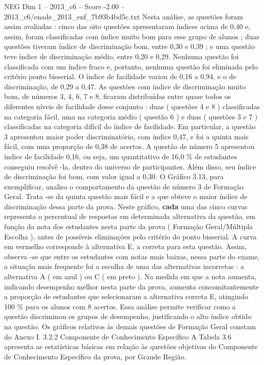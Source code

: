 \begin{textsample}{NEG Dim 1 – 2013\_c6 – Score -2.00 – 2013\_c6/enade\_2013\_enf\_7b93b4bd5c.txt}
Nesta análise, as questões foram assim avaliadas : cinco das oito questões apresentaram índices acima de 0,40 e, assim, foram classificadas com índice muito bom para esse grupo de alunos ; duas questões tiveram índice de discriminação bom, entre 0,30 e 0,39 ; e uma questão teve índice de discriminação médio, entre 0,20 e 0,29.
Nenhuma questão foi classificada com um índice fraco e, portanto, nenhuma questão foi eliminada pelo critério ponto bisserial.
O índice de facilidade variou de 0,16 a 0,94, e o de discriminação, de 0,29 a 0,47.
As questões com índice de discriminação muito bom, de números 3, 4, 6, 7 e 8, ficaram distribuídas entre quase todos os diferentes níveis de facilidade desse conjunto : duas ( questões 4 e 8 ) classificadas na categoria fácil, uma na categoria médio ( questão 6 ) e duas ( questões 3 e 7 ) classificadas na categoria difícil do índice de facilidade.
Em particular, a questão 3 apresentou maior poder discriminatório, com índice 0,47, e foi a quinta mais fácil, com uma proporção de 0,38 de acertos.
A questão de número 5 apresentou índice de facilidade 0,16, ou seja, um quantitativo de 16,0 \% de estudantes conseguiu resolvê -la, dentro do universo de participantes.
Além disso, seu índice de discriminação foi bom, com valor igual a 0,30.
O Gráfico 3.13, para exemplificar, analisa o comportamento da questão de número 3 de Formação Geral.
Trata -se da quinta questão mais fácil e a que obteve o maior índice de discriminação dessa parte da prova.
Neste gráfico, \textbf{cada} uma das cinco curvas representa o percentual de respostas em determinada alternativa da questão, em função da nota dos estudantes nesta parte da prova ( Formação Geral/Múltipla Escolha ), antes de possíveis eliminações pelo critério do ponto bisserial.
A curva em vermelho corresponde à alternativa E, a correta para esta questão.
Assim, observa -se que entre os estudantes com notas mais baixas, nessa parte do exame, a situação mais frequente foi a escolha de uma das alternativas incorretas : a alternativa A ( em azul ) ou C ( em preto ).
Na medida em que a nota aumenta, indicando desempenho melhor nesta parte da prova, aumenta concomitantemente a proporção de estudantes que selecionaram a alternativa correta E, atingindo 100 \% para os alunos com 8 acertos.
Essa análise permite verificar como a questão discriminou os grupos de desempenho, justificando o alto índice obtido na questão.
Os gráficos relativos às demais questões de Formação Geral constam do Anexo I. 3.2.2 Componente de Conhecimento Específico A Tabela 3.6 apresenta as estatísticas básicas em relação às questões objetivas do Componente de Conhecimento Específico da prova, por Grande Região.

\end{textsample}

